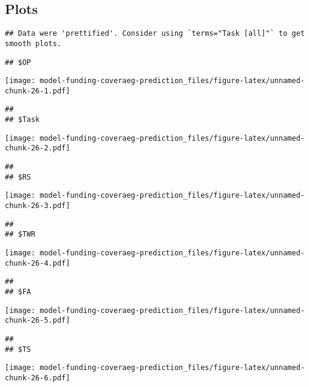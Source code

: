\documentclass[]{article}
\begin{document}
\hypertarget{plots-4}{%
\subsection{Plots}\label{plots-4}}

\begin{verbatim}
## Data were 'prettified'. Consider using `terms="Task [all]"` to get smooth plots.
\end{verbatim}

\begin{verbatim}
## $OP
\end{verbatim}

\texttt{[image: model-funding-coveraeg-prediction\_files/figure-latex/unnamed-chunk-26-1.pdf]}

\begin{verbatim}
## 
## $Task
\end{verbatim}

\texttt{[image: model-funding-coveraeg-prediction\_files/figure-latex/unnamed-chunk-26-2.pdf]}

\begin{verbatim}
## 
## $RS
\end{verbatim}

\texttt{[image: model-funding-coveraeg-prediction\_files/figure-latex/unnamed-chunk-26-3.pdf]}

\begin{verbatim}
## 
## $TWR
\end{verbatim}

\texttt{[image: model-funding-coveraeg-prediction\_files/figure-latex/unnamed-chunk-26-4.pdf]}

\begin{verbatim}
## 
## $FA
\end{verbatim}

\texttt{[image: model-funding-coveraeg-prediction\_files/figure-latex/unnamed-chunk-26-5.pdf]}

\begin{verbatim}
## 
## $TS
\end{verbatim}

\texttt{[image: model-funding-coveraeg-prediction\_files/figure-latex/unnamed-chunk-26-6.pdf]}
\end{document}
